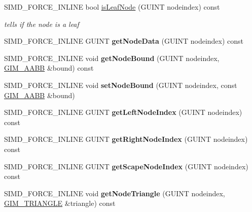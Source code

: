 \begin{DoxyCompactItemize}
S\+I\+M\+D\+\_\+\+F\+O\+R\+C\+E\+\_\+\+I\+N\+L\+I\+NE bool \hyperlink{classGIM__BOX__TREE__TEMPLATE__SET_a2388f9b52409031c7c1eb8144466ccda}{is\+Leaf\+Node} (G\+U\+I\+NT nodeindex) const
\begin{DoxyCompactList}\small\item\em tells if the node is a leaf \end{DoxyCompactList}\item 
\mbox{\label{classGIM__BOX__TREE__TEMPLATE__SET_ab0a92a8b6147367f76cb9ebe33fd4786}} 
S\+I\+M\+D\+\_\+\+F\+O\+R\+C\+E\+\_\+\+I\+N\+L\+I\+NE G\+U\+I\+NT {\bfseries get\+Node\+Data} (G\+U\+I\+NT nodeindex) const
\item 
\mbox{\label{classGIM__BOX__TREE__TEMPLATE__SET_aaeb802d091fd576c528d8cb74a783f47}} 
S\+I\+M\+D\+\_\+\+F\+O\+R\+C\+E\+\_\+\+I\+N\+L\+I\+NE void {\bfseries get\+Node\+Bound} (G\+U\+I\+NT nodeindex, \hyperlink{classGIM__AABB}{G\+I\+M\+\_\+\+A\+A\+BB} \&bound) const
\item 
\mbox{\label{classGIM__BOX__TREE__TEMPLATE__SET_aeb9993cf71068d07c9b12dae5157c76c}} 
S\+I\+M\+D\+\_\+\+F\+O\+R\+C\+E\+\_\+\+I\+N\+L\+I\+NE void {\bfseries set\+Node\+Bound} (G\+U\+I\+NT nodeindex, const \hyperlink{classGIM__AABB}{G\+I\+M\+\_\+\+A\+A\+BB} \&bound)
\item 
\mbox{\label{classGIM__BOX__TREE__TEMPLATE__SET_a74b8b97e7447050abf7ce6a52af9fffb}} 
S\+I\+M\+D\+\_\+\+F\+O\+R\+C\+E\+\_\+\+I\+N\+L\+I\+NE G\+U\+I\+NT {\bfseries get\+Left\+Node\+Index} (G\+U\+I\+NT nodeindex) const
\item 
\mbox{\label{classGIM__BOX__TREE__TEMPLATE__SET_ab5c3454c5dd0c971905f9d42ae26cb4b}} 
S\+I\+M\+D\+\_\+\+F\+O\+R\+C\+E\+\_\+\+I\+N\+L\+I\+NE G\+U\+I\+NT {\bfseries get\+Right\+Node\+Index} (G\+U\+I\+NT nodeindex) const
\item 
\mbox{\label{classGIM__BOX__TREE__TEMPLATE__SET_a9f71becbc8d9186689c5bc00293cafbc}} 
S\+I\+M\+D\+\_\+\+F\+O\+R\+C\+E\+\_\+\+I\+N\+L\+I\+NE G\+U\+I\+NT {\bfseries get\+Scape\+Node\+Index} (G\+U\+I\+NT nodeindex) const
\item 
\mbox{\label{classGIM__BOX__TREE__TEMPLATE__SET_a304de6f2f02351f2b361099ec1880827}} 
S\+I\+M\+D\+\_\+\+F\+O\+R\+C\+E\+\_\+\+I\+N\+L\+I\+NE void {\bfseries get\+Node\+Triangle} (G\+U\+I\+NT nodeindex, \hyperlink{classGIM__TRIANGLE}{G\+I\+M\+\_\+\+T\+R\+I\+A\+N\+G\+LE} \&triangle) const
\end{DoxyCompactItemize}

